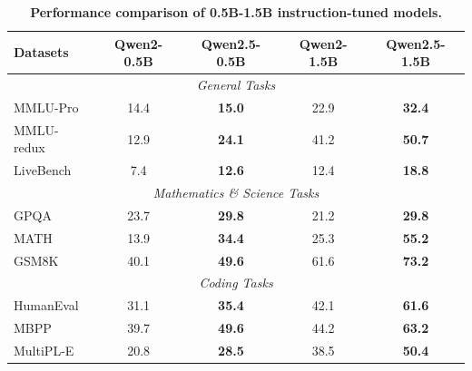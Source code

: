 \documentclass{article}
\begin{document}
\begin{table}[t]

\centering

\caption{\textbf{Performance comparison of 0.5B-1.5B instruction-tuned models.}}

\label{tab:2b-instruct}
\small
\setlength{\tabcolsep}{2.6pt}

\begin{tabular}{@{}lcccc@{}}

\toprule

\textbf{Datasets} & \textbf{Qwen2-0.5B} & \textbf{Qwen2.5-0.5B} & \textbf{Qwen2-1.5B} & \textbf{Qwen2.5-1.5B} \\

\midrule

\multicolumn{5}{c}{\textit{General Tasks}} \\

\midrule

MMLU-Pro & 14.4 & \textbf{15.0} & 22.9 & \textbf{32.4} \\

MMLU-redux & 12.9 & \textbf{24.1} & 41.2 & \textbf{50.7} \\

LiveBench & 7.4 & \textbf{12.6} & 12.4 & \textbf{18.8} \\

\midrule

\multicolumn{5}{c}{\textit{Mathematics \& Science Tasks}} \\

\midrule

GPQA & 23.7 & \textbf{29.8} & 21.2 & \textbf{29.8} \\

MATH & 13.9 & \textbf{34.4} & 25.3 & \textbf{55.2} \\

GSM8K & 40.1 & \textbf{49.6} & 61.6 & \textbf{73.2} \\

\midrule

\multicolumn{5}{c}{\textit{Coding Tasks}} \\

\midrule

HumanEval & 31.1 & \textbf{35.4} & 42.1 & \textbf{61.6} \\

MBPP & 39.7 & \textbf{49.6} & 44.2 & \textbf{63.2} \\

MultiPL-E & 20.8 & \textbf{28.5} & 38.5 & \textbf{50.4} \\


\end{tabular}
\end{table}
\end{document}
